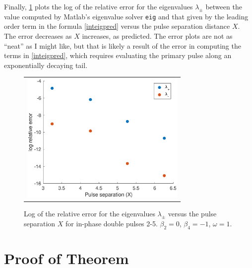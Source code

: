 \documentclass[12pt]{article}
\begin{document}
Finally, \cref{fig:inteigpred} plots the log of the relative error for the eigenvalues $\lambda_\pm$ between the value computed by Matlab's eigenvalue solver \texttt{eig} and that given by the leading order term in the formula \cref{inteigpred} versus the pulse separation distance $X$. The error decreases as $X$ increases, as predicted. The error plots are not as ``neat'' as I might like, but that is likely a result of the error in computing the terms in \cref{inteigpred}, which requires evaluating the primary pulse along an exponentially decaying tail.

\begin{figure}[H]
\centering
\begin{tabular}{c}
\includegraphics[width=8cm]{images/inteigpred.eps}
\end{tabular}
\caption{Log of the relative error for the eigenvalues $\lambda_\pm$ versus the pulse separation $X$ for in-phase double pulses 2-5. $\beta_2 = 0$, $\beta_4 = -1$, $\omega = 1$.}
\label{fig:inteigpred}
\end{figure}

\appendix

\section{Proof of Theorem}
\end{document}
